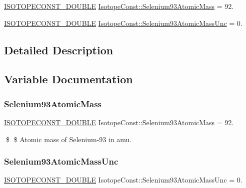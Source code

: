 \begin{DoxyCompactItemize}
\item 
\mbox{\hyperlink{group___isotope_const-_macros_ga8f45a7272ce02c0b4c65c44636ed719a}{I\+S\+O\+T\+O\+P\+E\+C\+O\+N\+S\+T\+\_\+\+D\+O\+U\+B\+LE}} \mbox{\hyperlink{group___isotope_const-_selenium-_se93_gababeb5d0845f57834f88bc74d18e62ec}{Isotope\+Const\+::\+Selenium93\+Atomic\+Mass}} = 92.
\item 
\mbox{\hyperlink{group___isotope_const-_macros_ga8f45a7272ce02c0b4c65c44636ed719a}{I\+S\+O\+T\+O\+P\+E\+C\+O\+N\+S\+T\+\_\+\+D\+O\+U\+B\+LE}} \mbox{\hyperlink{group___isotope_const-_selenium-_se93_ga5fda40e29188262170092a5e67542560}{Isotope\+Const\+::\+Selenium93\+Atomic\+Mass\+Unc}} = 0.
\end{DoxyCompactItemize}


\subsection{Detailed Description}


\subsection{Variable Documentation}
\mbox{\label{group___isotope_const-_selenium-_se93_gababeb5d0845f57834f88bc74d18e62ec}} 
\subsubsection{\texorpdfstring{Selenium93\+Atomic\+Mass}{Selenium93AtomicMass}}
{\footnotesize\ttfamily \mbox{\hyperlink{group___isotope_const-_macros_ga8f45a7272ce02c0b4c65c44636ed719a}{I\+S\+O\+T\+O\+P\+E\+C\+O\+N\+S\+T\+\_\+\+D\+O\+U\+B\+LE}} Isotope\+Const\+::\+Selenium93\+Atomic\+Mass = 92.}

\$ \$ Atomic mass of Selenium-\/93 in amu. \mbox{\label{group___isotope_const-_selenium-_se93_ga5fda40e29188262170092a5e67542560}} 
\subsubsection{\texorpdfstring{Selenium93\+Atomic\+Mass\+Unc}{Selenium93AtomicMassUnc}}
{\footnotesize\ttfamily \mbox{\hyperlink{group___isotope_const-_macros_ga8f45a7272ce02c0b4c65c44636ed719a}{I\+S\+O\+T\+O\+P\+E\+C\+O\+N\+S\+T\+\_\+\+D\+O\+U\+B\+LE}} Isotope\+Const\+::\+Selenium93\+Atomic\+Mass\+Unc = 0.}


